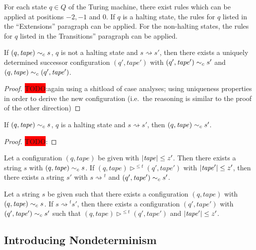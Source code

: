 \documentclass[a4paper,UKenglish,cleveref, autoref]{lipics-v2019}
\newcommand{\TODO}[1]{\colorbox{red}{\LARGE TODO}:#1}
\newcommand{\strent}{\rightsquigarrow}
\begin{document}
\begin{lemma}
  For each state $q \in Q$ of the Turing machine, there exist rules which can be applied at positions $-2, -1$ and $0$. If $q$ is a halting state, the rules for $q$ listed in the ``Extensions'' paragraph can be applied. For the non-halting states, the rules for $q$ listed in the Transitions'' paragraph can be applied.
\end{lemma}

\begin{lemma}
  If $(q, \mathit{tape}) \sim_c{} s$, $q$ is not a halting state and $s \strent{} s'$, then there exists a uniquely determined successor configuration $(q', \mathit{tape}')$ with $(q', \mathit{tape}') \sim_c{} s'$ and $(q, \mathit{tape}) \sim_c (q', \mathit{tape}')$. 
\end{lemma}
\begin{proof}
  \TODO{again using a shitload of case analyses; using uniqueness properties in order to derive the new configuration (i.e.\ the reasoning is similar to the proof of the other direction)}
\end{proof}

\begin{lemma}
  If $(q, \mathit{tape}) \sim_c{} s$, $q$ is a halting state and $s \strent{} s'$, then $(q, \mathit{tape}) \sim_c{} s'$. 
\end{lemma}
\begin{proof}
  \TODO{}
\end{proof}

\begin{theorem}[Completeness]
  Let a configuration $(q, \mathit{tape})$ be given with $|\mathit{tape}| \le z'$. Then there exists a string $s$ with $(q, \mathit{tape}) \sim_c{} s$. If $(q, \mathit{tape}) \rhd^{\le t} (q', \mathit{tape}')$ with $|\mathit{tape}'| \le z'$, then there exists a string $s'$ with $s \strent{}^t$ and $(q', \mathit{tape}') \sim_c{} s'$.  
\end{theorem}

\begin{theorem}[Soundness]
  Let a string $s$ be given such that there exists a configuration $(q, \mathit{tape})$ with $(q, \mathit{tape}) \sim_c{} s$. If $s \strent{}^t s'$, then there exists a configuration $(q', \mathit{tape}')$ with $(q', \mathit{tape}') \sim_c{} s'$ such that $(q, \mathit{tape}) \rhd^{\le t} (q', \mathit{tape}')$ and $|\mathit{tape}'| \le z'$. 
\end{theorem}

\subsection{Introducing Nondeterminism}
\end{document}
